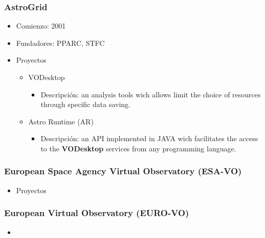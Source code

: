 \subsubsection{AstroGrid}
	\begin{itemize}
		\item Comienzo: 2001
		\item Fundadores: PPARC, STFC
		\item Proyectos
		\begin{itemize}
			\item VODesktop
			\begin{itemize}
				\item Descripción: an analysis tools wich allows limit the choice of resources through specific data saving.
			\end{itemize}
			\item Astro Runtime (AR)
			\begin{itemize}
				\item Descripción: an API implemented in JAVA wich facilitates the access to the \textbf{VODesktop} services from any programming language.
			\end{itemize}
		\end{itemize}
	\end{itemize}

\subsubsection{European Space Agency Virtual Observatory (ESA-VO)}
	\begin{itemize}
		\item Proyectos
	\end{itemize}

\subsubsection{European Virtual Observatory (EURO-VO)}
	\begin{itemize}
		\item
	\end{itemize}

